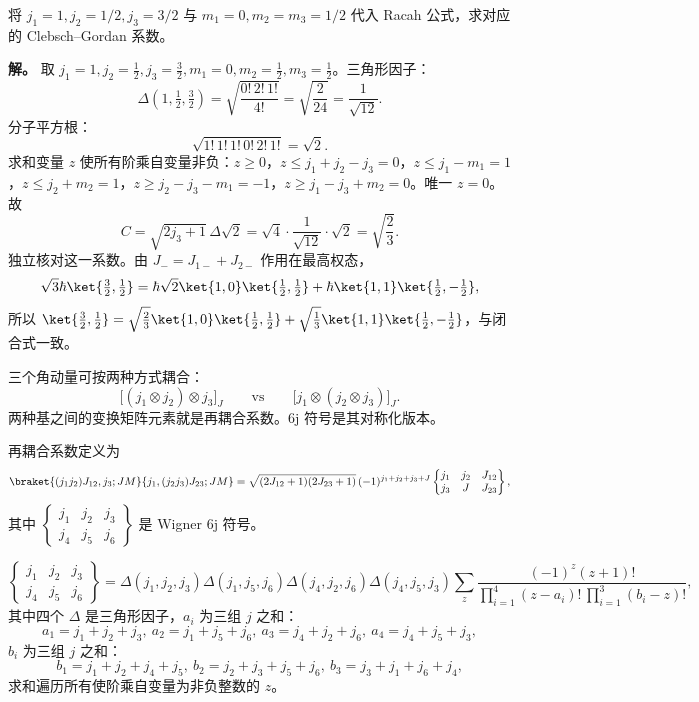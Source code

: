 \par\medskip
\par\medskip
\begin{example}
将 $j_1=1,j_2=1/2,j_3=3/2$ 与 $m_1=0,m_2=m_3=1/2$ 代入 Racah 公式，求对应的 Clebsch--Gordan 系数。

\textbf{解。} 取 $j_1=1,j_2=\frac12,j_3=\frac32,m_1=0,m_2=\frac12,m_3=\frac12$。三角形因子：
\[
\Delta(1,\tfrac12,\tfrac32)=\sqrt{\frac{0!\,2!\,1!}{4!}}=\sqrt{\frac{2}{24}}=\frac1{\sqrt{12}}.
\]
分子平方根：
\[
\sqrt{1!\,1!\,1!\,0!\,2!\,1!}=\sqrt{2}.
\]
求和变量 $z$ 使所有阶乘自变量非负：$z\ge0$，$z\le j_1+j_2-j_3=0$，$z\le j_1-m_1=1$，$z\le j_2+m_2=1$，$z\ge j_2-j_3-m_1=-1$，$z\ge j_1-j_3+m_2=0$。唯一 $z=0$。故
\[
C=\sqrt{2j_3+1}\,\Delta\sqrt{2}
=\sqrt4\cdot\frac1{\sqrt{12}}\cdot\sqrt2=\sqrt{\frac23}.
\]
独立核对这一系数。由 $J_-=J_{1-}+J_{2-}$ 作用在最高权态，
\[
\sqrt3\hbar\ket{\tfrac32,\tfrac12}
=\hbar\sqrt2\ket{1,0}\ket{\tfrac12,\tfrac12}
+\hbar\ket{1,1}\ket{\tfrac12,-\tfrac12},
\]
所以 $\ket{\tfrac32,\tfrac12}=\sqrt{\frac23}\ket{1,0}\ket{\tfrac12,\tfrac12}+\sqrt{\frac13}\ket{1,1}\ket{\tfrac12,-\tfrac12}$，与闭合式一致。
\end{example}
三个角动量可按两种方式耦合：
\[
\bigl[(j_1\otimes j_2)\otimes j_3\bigr]_{J}
\qquad\text{vs}\qquad
\bigl[j_1\otimes(j_2\otimes j_3)\bigr]_{J}.
\]
两种基之间的变换矩阵元素就是再耦合系数。6j 符号是其对称化版本。
\begin{definition}
再耦合系数定义为
\[
\braket{(j_1 j_2)J_{12},j_3;JM}{j_1,(j_2 j_3)J_{23};JM}
=\sqrt{(2J_{12}+1)(2J_{23}+1)}\,(-1)^{j_1+j_2+j_3+J}
\begin{Bmatrix}j_1&j_2&J_{12}\\j_3&J&J_{23}\end{Bmatrix},
\]
其中 $\begin{Bmatrix}j_1&j_2&j_3\\j_4&j_5&j_6\end{Bmatrix}$ 是 Wigner 6j 符号。
\end{definition}
\begin{theorem}
\[
\begin{Bmatrix}j_1&j_2&j_3\\j_4&j_5&j_6\end{Bmatrix}
=\Delta(j_1,j_2,j_3)\Delta(j_1,j_5,j_6)\Delta(j_4,j_2,j_6)\Delta(j_4,j_5,j_3)
\sum_z\frac{(-1)^z(z+1)!}{\prod_{i=1}^4(z-a_i)!\,\prod_{i=1}^3(b_i-z)!},
\]
其中四个 $\Delta$ 是三角形因子，$a_i$ 为三组 $j$ 之和：
\[
a_1=j_1+j_2+j_3,\ a_2=j_1+j_5+j_6,\ a_3=j_4+j_2+j_6,\ a_4=j_4+j_5+j_3,
\]
$b_i$ 为三组 $j$ 之和：
\[
b_1=j_1+j_2+j_4+j_5,\ b_2=j_2+j_3+j_5+j_6,\ b_3=j_3+j_1+j_6+j_4,
\]
求和遍历所有使阶乘自变量为非负整数的 $z$。
\label{thm:6j-racah}
\end{theorem}
